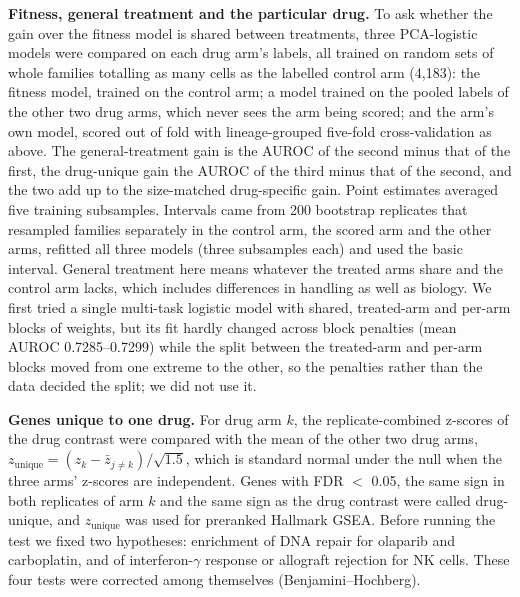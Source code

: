\documentclass[11pt,a4paper]{article}
\begin{document}
\textbf{Fitness, general treatment and the particular drug.} To ask whether the gain over the fitness model is shared between treatments, three PCA-logistic models were compared on each drug arm's labels, all trained on random sets of whole families totalling as many cells as the labelled control arm (4,183): the fitness model, trained on the control arm; a model trained on the pooled labels of the other two drug arms, which never sees the arm being scored; and the arm's own model, scored out of fold with lineage-grouped five-fold cross-validation as above. The general-treatment gain is the AUROC of the second minus that of the first, the drug-unique gain the AUROC of the third minus that of the second, and the two add up to the size-matched drug-specific gain. Point estimates averaged five training subsamples. Intervals came from 200 bootstrap replicates that resampled families separately in the control arm, the scored arm and the other arms, refitted all three models (three subsamples each) and used the basic interval. General treatment here means whatever the treated arms share and the control arm lacks, which includes differences in handling as well as biology. We first tried a single multi-task logistic model with shared, treated-arm and per-arm blocks of weights, but its fit hardly changed across block penalties (mean AUROC 0.7285--0.7299) while the split between the treated-arm and per-arm blocks moved from one extreme to the other, so the penalties rather than the data decided the split; we did not use it.

\textbf{Genes unique to one drug.} For drug arm $k$, the replicate-combined z-scores of the drug contrast were compared with the mean of the other two drug arms, $z_{\text{unique}} = (z_k - \bar z_{j \neq k}) / \sqrt{1.5}$, which is standard normal under the null when the three arms' z-scores are independent. Genes with FDR $<$ 0.05, the same sign in both replicates of arm $k$ and the same sign as the drug contrast were called drug-unique, and $z_{\text{unique}}$ was used for preranked Hallmark GSEA. Before running the test we fixed two hypotheses: enrichment of DNA repair for olaparib and carboplatin, and of interferon-$\gamma$ response or allograft rejection for NK cells. These four tests were corrected among themselves (Benjamini--Hochberg).
\end{document}
